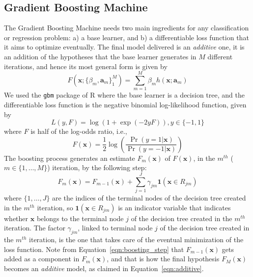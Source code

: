 \subsection{Gradient Boosting Machine}
\label{subsec:gbm}
The Gradient Boosting Machine \cite{Friedman01} needs two main ingredients for any classification or regression problem: a) a base learner, and b) a differentiable loss function that it aims to optimize eventually. The final model delivered is an {\em additive} one, it is an addition of the hypotheses that the base learner generates in $M$ different iterations, and hence its most general form is given by 
\begin{equation}
\label{eqn:additive}
F(\mathbf{x};\{{\beta}_m, \mathbf{a}_m\}_1^M) = \sum_{m=1}^M{\beta}_mh(\mathbf{x};{\mathbf{a}}_m)
\end{equation}
We used the \texttt{gbm} package of R \cite{gbm} where the base learner is a decision tree, and the differentiable loss function is the negative binomial log-likelihood function, given by 
\begin{equation}
\label{eqn:nbll}
L(y,F) = \log{(1 + \exp(-2yF))}, y \in \{-1,1\}
\end{equation}
where $F$ is half of the log-odds ratio, i.e., 
\begin{equation}
\label{eqn:hlo}
F(\mathbf{x}) = \frac{1}{2}\log{(\frac{\Pr(y = 1|\mathbf{x})}{\Pr(y = -1|\mathbf{x})})}
\end{equation}
The boosting process generates an estimate $F_m(\mathbf{x})$ of $F(\mathbf{x})$, in the $m^{th}$ ($m \in \{1,\ldots,M\}$) iteration, by the following step:
\begin{equation}
\label{eqn:boosting_step}
F_m(\mathbf{x}) = F_{m-1}(\mathbf{x}) + \sum_{j=1}^J{\gamma}_{jm}\mathbf{1}(\mathbf{x} \in R_{jm})
\end{equation}
where $\{1,\ldots,J\}$ are the indices of the terminal nodes of the decision tree created in the $m^{th}$ iteration, so $\mathbf{1}(\mathbf{x} \in R_{jm})$ is an indicator variable that indicates whether $\mathbf{x}$ belongs to the terminal node $j$ of the decision tree created in the $m^{th}$ iteration. The factor ${\gamma}_{jm}$, linked to terminal node $j$ of the decision tree created in the $m^{th}$ iteration, is the one that takes care of the eventual minimization of the loss function. Note from Equation~\ref{eqn:boosting_step}
 that $F_{m-1}(\mathbf{x})$ gets added as a component in $F_m(\mathbf{x})$, and that is how the final hypothesis $F_M(\mathbf{x})$ becomes an {\em additive} model, as claimed in Equation~\ref{eqn:additive}.\\

